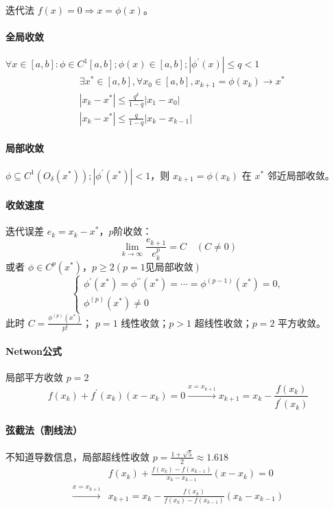 \documentclass[twocolumn]{ctexart}
\begin{document}
迭代法 $f(x)=0\Rightarrow x=\phi(x)$。

\paragraph{全局收敛} 

$\forall x\in [a,b]: \phi\in C^1[a,b]; \phi(x)\in [a,b]; |\phi^\prime(x)|\leq q<1$
\begin{align*}
    &\exists x^*\in[a,b],\forall x_0\in[a,b],x_{k+1}=\phi(x_k)\rightarrow x^* \\
    & |x_k-x^*|\leq \frac{q^k}{1-q}|x_1-x_0|\\
    & |x_k-x^*|\leq \frac{q}{1-q}|x_k-x_{k-1}|
\end{align*}

\paragraph{局部收敛}

$\phi\subseteq C^1(O_\delta(x^*)); |\phi^\prime(x^*)|<1$，则 $x_{k+1}=\phi(x_k)$ 在 $x^*$ 邻近局部收敛。

\paragraph{收敛速度} 迭代误差 $e_k=x_k-x^*$，$p$阶收敛：
\begin{equation*}
    \lim_{k\rightarrow\infty}\frac{e_{k+1}}{e_k^p}=C\quad (C\neq 0)
\end{equation*}
或者 $\phi\in C^{p}(x^*)$，$p\geq 2 (p=1\text{见局部收敛})$
\begin{equation*}
    \begin{cases}
        \phi^\prime(x^*)=\phi^{\prime\prime}(x^*)=\cdots=\phi^{(p-1)}(x^*)=0,\\
        \phi^{(p)}(x^*)\neq 0
    \end{cases}
\end{equation*}此时 $C=\frac{\phi^{(p)}(x^*)}{p!}$；
$p=1$ 线性收敛；$p>1$ 超线性收敛；$p=2$ 平方收敛。

\paragraph{Netwon公式} 局部平方收敛 $p=2$ \begin{equation*}
    f(x_k)+f^\prime(x_k)(x-x_k)=0\xrightarrow{x=x_{k+1}} x_{k+1}=x_k-\frac{f(x_k)}{f^\prime(x_k)}
\end{equation*}

\paragraph{弦截法（割线法）} 不知道导数信息，局部超线性收敛 $p=\frac{1+\sqrt{5}}{2}\approx  1.618$\begin{align*}
    &f(x_k)+\frac{f(x_k)-f(x_{k-1})}{x_k-x_{k-1}}(x-x_k)=0\\
    \xrightarrow{x=x_{k+1}}& x_{k+1}=x_k-\frac{f(x_k)}{f(x_k)-f(x_{k-1})}(x_k-x_{k-1})
\end{align*}
\end{document}
